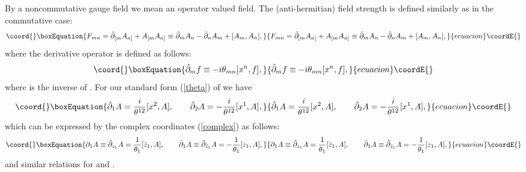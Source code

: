 \documentclass[a4paper,a4paper]{article}
\begin{document}
By a noncommutative gauge field \coordHE{} we mean an operator valued
field. The (anti-hermitian) field strength \coordHE{} is defined
similarly as in the commutative case:
\begin{equation}\coord{}\boxEquation{
\label{F by A}
F_{mn}=\hat\partial_{[m} A_{n]} + A_{[m} A_{n]}
\equiv \hat\partial_m A_n - \hat\partial_n A_m + [A_m, A_n],
}{
F_{mn}=\hat\partial_{[m} A_{n]} + A_{[m} A_{n]}
\equiv \hat\partial_m A_n - \hat\partial_n A_m + [A_m, A_n],
}{ecuacion}\coordE{}\end{equation}
where the derivative operator \coordHE{} is defined as follows:
\begin{equation}\coord{}\boxEquation{
\hat\partial_m f \equiv - i \theta_{mn} [x^n, f],
}{
\hat\partial_m f \equiv - i \theta_{mn} [x^n, f],
}{ecuacion}\coordE{}\end{equation}
where \coordHE{} is the inverse of \coordHE{}.
For our standard form (\ref{theta}) of \coordHE{} we have
\begin{equation}\coord{}\boxEquation{
\hat\partial_1 A = {i \over \theta^{12}} [x^2,A],
\qquad \hat\partial_2 A = - {i \over \theta^{12}} [x^1,A],
}{
\hat\partial_1 A = {i \over \theta^{12}} [x^2,A],
\qquad \hat\partial_2 A = - {i \over \theta^{12}} [x^1,A],
}{ecuacion}\coordE{}\end{equation}
which can be expressed by the complex coordinates (\ref{complex}) as
follows:
\begin{equation}\coord{}\boxEquation{
\partial_1 A \equiv \hat
\partial_{z_1} A = {1\over \theta_1} [\bar z_1, A],
\qquad \bar\partial_1 A \equiv \hat\partial_{\bar z_1} A
= - {1\over \theta_1} [z_1, A],
}{
\partial_1 A \equiv \hat
\partial_{z_1} A = {1\over \theta_1} [\bar z_1, A],
\qquad \bar\partial_1 A \equiv \hat\partial_{\bar z_1} A
= - {1\over \theta_1} [z_1, A],
}{ecuacion}\coordE{}\end{equation}
and similar relations for \coordHE{} and \coordHE{}.
\end{document}
